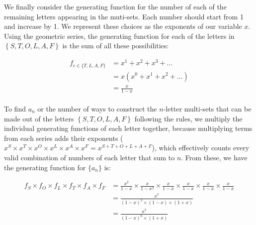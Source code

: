 \documentclass[10pt]{article}
\begin{document}
\begin{enumerate}
We finally consider the generating function for the number of each of the remaining letters appearing in the muti-sets.
Each number should start from 1 and increase by 1. We represent these choices as the exponents of our variable $x$. Using the geometric series, the generating function for each of the letters in $\left\{  S,T,O,L,A,F \right\}$ is the sum of all these possibilities:

\begin{align*}
f_{c \in \{T,L,A,F\}} &= x^1 + x^2 + x^3 +\ldots  \\
    &= x(x^0 + x^1 + x^2 +\ldots) \\
    &=  \frac{x}{1-x}\\
\end{align*}

To find $a_n$ or the number of ways to construct the $n$-letter multi-sets that can be made out of the letters $\left\{  S,T,O,L,A,F \right\}$ following the rules, we multiply the individual generating functions of each letter together, because multiplying terms from each series adds their exponents ($x^{S} \times x^{T} \times x^{O} \times x^{L} \times x^{A} \times x^{F}  = x^{S + T + O + L + A+ F}$), which effectively counts every valid combination of numbers of each letter that sum to $n$. From these, we have the generating function for $\{a_n\}$ is:

\begin{align*}
f_{S} \times f_{O} \times f_L \times f_T \times f_A \times f_F &= \frac{x^2}{1-x} \times \frac{x}{1-x^2} \times  \frac{x}{1-x} \times  \frac{x}{1-x} \times  \frac{x}{1-x} \times  \frac{x}{1-x}\\
&= \frac{x^7}{(1-x)^5 \times (1-x)\times (1+x)} \\
&= \frac{x^7}{(1-x)^6\times (1+x)} \\
\end{align*}

\end{enumerate}
\end{document}
